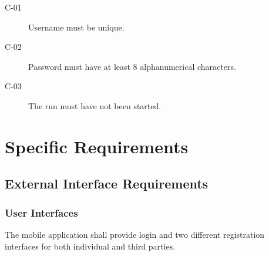 \documentclass[a4paper]{article}
\begin{document}
        \begin{description}
        \item
        \end{description}
        
        \begin{description}
        \item[C-01] Username must be unique.
        \item[C-02] Password must have at least 8 alphanumerical characters.
        \item[C-03] The run must have not been started.
        \end{description}
        
\newpage
\section{Specific Requirements}

    \subsection{External Interface Requirements}
        
        \subsubsection{User Interfaces}
        
        The mobile application shall provide login and two different registration interfaces for both individual and third parties.
        
\end{document}
